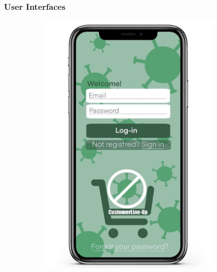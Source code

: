 \documentclass[a4paper, 12pt, oneside]{article}
\begin{document}
\subsubsection{User Interfaces}
\begin{figure}[hbt]
\centering
\begin{subfigure}
	\centering
  	\includegraphics[height=0.26\textheight, scale=0.2, keepaspectratio]{img/GUI/login.jpg} 
 \end{subfigure}
 \begin{subfigure}
	\centering

\end{subfigure}
\end{figure}
\end{document}
